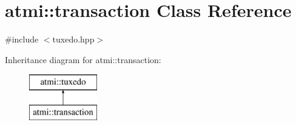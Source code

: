 \hypertarget{classatmi_1_1transaction}{}\section{atmi\+:\+:transaction Class Reference}
\label{classatmi_1_1transaction}


{\ttfamily \#include $<$tuxedo.\+hpp$>$}

Inheritance diagram for atmi\+:\+:transaction\+:\begin{figure}[H]
\begin{center}
\leavevmode
\includegraphics[height=2.000000cm]{classatmi_1_1transaction}
\end{center}
\end{figure}

